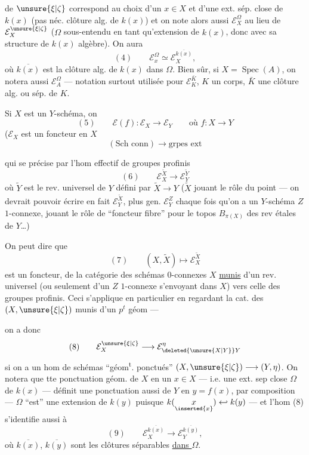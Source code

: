 de $\unsure{\xi|\zeta}$ correspond au choix d'un $x\in X$ et d'une ext. sép. close  \inserted{$\Omega$} de $k(x)$ (pas néc.  clôture alg. de $k(x)$) et on note alors aussi $\mathcal E_X^\Omega$ au lieu de $\mathcal E_X^{\unsure{\xi|\zeta}}$ ($\Omega$ sous-entendu en tant qu'extension de $k(x)$, donc avec sa structure de $k(x)$ algèbre). On aura 
\[
(4)\qquad \mathcal E_x^\Omega\simeq\mathcal E_X^{\overline{k(x)}},
\]
où $\overline{k(x)}$ est la clôture  alg. de $k(x)$ dans $\Omega$. Bien sûr, si $X=\operatorname{Spec}(A)$, on notera aussi $\mathcal E_A^\Omega$ --- notation surtout utilisée pour $\mathcal E_K^{\bar K}$, $K$ un corps, $\bar K$ une clôture alg. ou sép. de $K$.

Si $X$ est un $Y$-schéma,  on 
\[
(5)\qquad \mathcal E(f):\mathcal E_X\longrightarrow\mathcal E_Y\qquad\text{où }f:X\longrightarrow Y
\]
($\mathcal E_X$ est un foncteur en $X$
\[
(\text{Sch conn})\longrightarrow\text{grpes ext}
\]


qui se précise par l'hom effectif de groupes profinis
\[
(6)\qquad \mathcal E_X^{\widetilde X}\longrightarrow\mathcal E_Y^{\widetilde Y}
\]
où $\widetilde Y$ est le rev. universel de $Y$ défini par $\widetilde X\longrightarrow Y$ ($\widetilde X$ jouant le rôle du point --- on devrait pouvoir écrire en fait $\mathcal E_Y^{\widetilde X}$, plus gen. $\mathcal E_Y^Z$ chaque fois qu'on a un $Y$-schéma $Z$ $1$-connexe, jouant le rôle de ``foncteur fibre'' pour le topos $B_{\pi(X)}$ des rev étales de $Y$\ldots)


On peut dire que
\[
(7)\qquad (X,\widetilde X)\longmapsto\mathcal E_X^{\widetilde X}
\]
est un foncteur, de la catégorie des schémas $0$-connexes $X$ \uline{munis} d'un rev. universel (ou seulement d'un $Z$ $1$-connexe s'envoyant dans $X$) vers celle des groupes profinis. Ceci s'applique en particulier en regardant la cat. des $(X,\unsure{\xi|\zeta})$ munis d'un $p^t$ géom ---



on a donc
\[
(8)\qquad \mathcal E_X^{\unsure{\xi|\zeta}}\longrightarrow\mathcal E_{\deleted{\unsure{X|Y}}Y}^{\eta}
\]
si on a un hom de schémas ``géom\textsuperscript{t}. ponctués'' $(X,\unsure{\xi|\zeta})\longrightarrow(Y,\eta)$. On notera que tte ponctuation géom. de $X$ en un $x\in X$ --- i.e. une ext. sep close $\Omega$ de $k(x)$ --- définit  une ponctuation  aussi de $Y$ en $y=f(x)$,  par composition --- $\Omega$ ``est'' une extension de $k(y)$ puisque $k(\underset{\inserted{x}}{x})\hookleftarrow k(y)$ --- et l'hom (8) s'identifie aussi à
\[
(9)\qquad \mathcal E_X^{\overline{k(x)}}\longrightarrow\mathcal E_Y^{\overline{k(y)}},
\]
où $\overline{k(x)}$, $\overline{k(y)}$ sont les clôtures séparables \uline{dans $\Omega$}.


